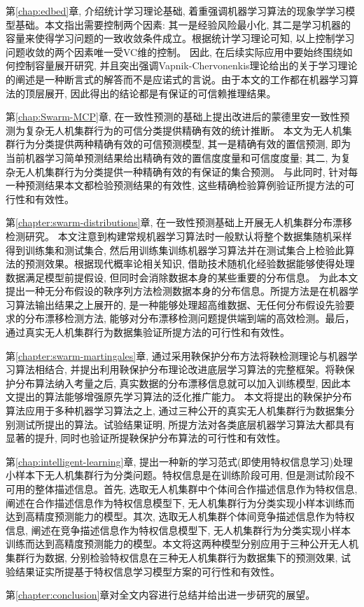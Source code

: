 第\ref{chap:edbed}章, 介绍统计学习理论基础, 着重强调机器学习算法的现象学学习模型基础。本文指出需要控制两个因素: 其一是经验风险最小化, 其二是学习机器的容量来使得学习问题的一致收敛条件成立。根据统计学习理论可知, 以上控制学习问题收敛的两个因素唯一受VC维的控制。 因此, 在后续实际应用中要始终围绕如何控制容量展开研究, 并且突出强调Vapnik-Chervonenkis理论给出的关于学习理论的阐述是一种断言式的解答而不是应诺式的言说。由于本文的工作都在机器学习算法的顶层展开, 因此得出的结论都是有保证的可信赖推理结果。

第\ref{chap:Swarm-MCP}章, 在一致性预测的基础上提出改进后的蒙德里安一致性预测为复杂无人机集群行为的可信分类提供精确有效的统计推断。 本文为无人机集群行为分类提供两种精确有效的可信预测模型, 其一是精确有效的置信预测, 即为当前机器学习简单预测结果给出精确有效的置信度度量和可信度度量; 其二, 为复杂无人机集群行为分类提供一种精确有效的有保证的集合预测。 与此同时, 针对每一种预测结果本文都检验预测结果的有效性, 这些精确检验算例验证所提方法的可行性和有效性。

第\ref{chapter:swarm-distributions}章, 在一致性预测基础上开展无人机集群分布漂移检测研究。 本文注意到构建常规机器学习算法时一般默认将整个数据集随机采样得到训练集和测试集合, 然后用训练集训练机器学习算法并在测试集合上检验此算法的预测效果。根据现代概率论相关知识, 借助技术随机化经验数据能够使得处理数据满足模型前提假设, 但同时会消除数据本身的某些重要的分布信息。 为此本文提出一种无分布假设的鞅序列方法检测数据本身的分布信息。所提方法是在机器学习算法输出结果之上展开的, 是一种能够处理超高维数据、无任何分布假设先验要求的分布漂移检测方法, 能够对分布漂移检测问题提供端到端的高效检测。最后，通过真实无人机集群行为数据集验证所提方法的可行性和有效性。

第\ref{chapter:swarm-martingales}章, 通过采用鞅保护分布方法将鞅检测理论与机器学习算法相结合, 并提出利用鞅保护分布理论改进底层学习算法的完整框架。将鞅保护分布算法纳入考量之后, 真实数据的分布漂移信息就可以加入训练模型, 因此本文提出的算法能够增强原先学习算法的泛化推广能力。 本文将提出的鞅保护分布算法应用于多种机器学习算法之上, 通过三种公开的真实无人机集群行为数据集分别测试所提出的算法。试验结果证明, 所提方法对各类底层机器学习算法大都具有显著的提升, 同时也验证所提鞅保护分布算法的可行性和有效性。

第\ref{chap:intelligent-learning}章, 提出一种新的学习范式(即使用特权信息学习)处理小样本下无人机集群行为分类问题。特权信息是在训练阶段可用, 但是测试阶段不可用的整体描述信息。首先, 选取无人机集群中个体间合作描述信息作为特权信息, 阐述在合作描述信息作为特权信息模型下, 无人机集群行为分类实现小样本训练而达到高精度预测能力的模型。其次, 选取无人机集群个体间竞争描述信息作为特权信息, 阐述在竞争描述信息作为特权信息模型下, 无人机集群行为分类实现小样本训练而达到高精度预测能力的模型。本文将这两种模型分别应用于三种公开无人机集群行为数据, 分别检验特权信息在三种无人机集群行为数据集下的预测效果, 试验结果证实所提基于特权信息学习模型方案的可行性和有效性。

第\ref{chapter:conclusion}章对全文内容进行总结并给出进一步研究的展望。